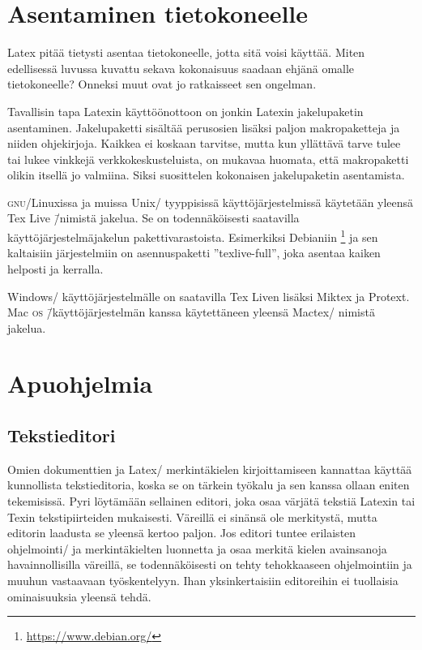 \section{Asentaminen tietokoneelle}
\label{luku/asentaminen}

Latex pitää tietysti asentaa tietokoneelle, jotta sitä voisi käyttää.
Miten edellisessä luvussa kuvattu sekava kokonaisuus saadaan ehjänä
omalle tietokoneelle? Onneksi muut ovat jo ratkaisseet sen ongelman.

Tavallisin tapa Latexin käyttöönottoon on jonkin Latexin jakelupaketin
asentaminen. Jakelupaketti sisältää perusosien lisäksi paljon
makropaketteja ja niiden ohjekirjoja. Kaikkea ei koskaan tarvitse, mutta
kun yllättävä tarve tulee tai lukee vinkkejä verkkokeskusteluista, on
mukavaa huomata, että makropaketti olikin itsellä jo valmiina. Siksi
suosittelen kokonaisen jakelupaketin asentamista.

\textsc{gnu}/Linuxissa ja muissa Unix\-/ tyyppisissä
käyttöjärjestelmissä käytetään yleensä Tex Live \=/nimistä jakelua. Se
on todennäköisesti saatavilla käyttöjärjestelmäjakelun
pakettivarastoista. Esimerkiksi Debianiin%
\footnote{\url{https://www.debian.org/}} ja sen kaltaisiin järjestelmiin
on asennuspaketti ''texlive-full'', joka asentaa kaiken helposti ja
kerralla.

Windows\-/ käyttöjärjestelmälle on saatavilla Tex Liven lisäksi Miktex
ja Protext. Mac \textsc{os} \=/käyttöjärjestelmän kanssa käytettäneen
yleensä Mactex\-/ nimistä jakelua.

\section{Apuohjelmia}

\subsection{Tekstieditori}

Omien dokumenttien ja Latex\-/ merkintäkielen kirjoittamiseen kannattaa
käyttää kunnollista tekstieditoria, koska se on tärkein työkalu ja sen
kanssa ollaan eniten tekemisissä. Pyri löytämään sellainen editori, joka
osaa värjätä tekstiä Latexin tai Texin tekstipiirteiden mukaisesti.
Väreillä ei sinänsä ole merkitystä, mutta editorin laadusta se yleensä
kertoo paljon. Jos editori tuntee erilaisten ohjelmointi\-/{} ja
merkintäkielten luonnetta ja osaa merkitä kielen avainsanoja
havainnollisilla väreillä, se todennäköisesti on tehty tehokkaaseen
ohjelmointiin ja muuhun vastaavaan työskentelyyn. Ihan yksinkertaisiin
editoreihin ei tuollaisia ominaisuuksia yleensä tehdä.

